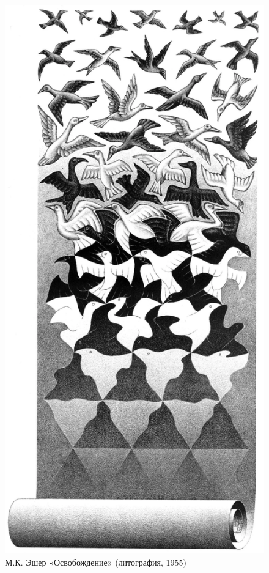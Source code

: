 \documentclass[../main.tex]{subfiles}
\begin{document}
\begin{figure}
    \centering
    \includegraphics[max width=\textwidth, max totalheight=\textheight-2\baselineskip]{img/escher-liberation.png}
    \caption{М.К. Эшер «Освобождение» (литография, 1955)}
    \label{fig:escher-liberation}
\end{figure}
\end{document}
